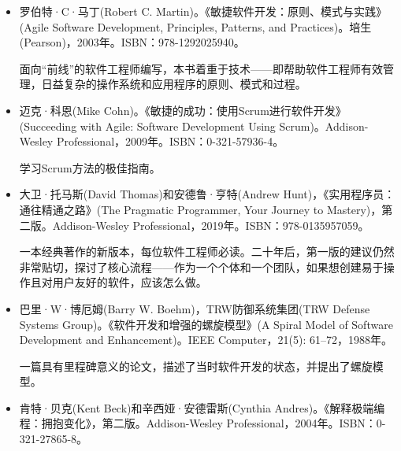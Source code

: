 \begin{itemize}
\item
罗伯特·C·马丁(Robert C. Martin)。《敏捷软件开发：原则、模式与实践》(Agile Software Development, Principles, Patterns, and Practices)。培生(Pearson)，2003年。ISBN：978-1292025940。

\hspace*{\fill}

面向“前线”的软件工程师编写，本书着重于技术——即帮助软件工程师有效管理，日益复杂的操作系统和应用程序的原则、模式和过程。

\hspace*{\fill}

\item
迈克·科恩(Mike Cohn)。《敏捷的成功：使用Scrum进行软件开发》(Succeeding with Agile: Software Development Using Scrum)。Addison-Wesley Professional，2009年。ISBN：0-321-57936-4。

\hspace*{\fill}

学习Scrum方法的极佳指南。

\hspace*{\fill}

\item
大卫·托马斯(David Thomas)和安德鲁·亨特(Andrew Hunt)，《实用程序员：通往精通之路》(The Pragmatic Programmer, Your Journey to Mastery)，第二版。Addison-Wesley Professional，2019年。ISBN：978-0135957059。

\hspace*{\fill}

一本经典著作的新版本，每位软件工程师必读。二十年后，第一版的建议仍然非常贴切，探讨了核心流程——作为一个个体和一个团队，如果想创建易于操作且对用户友好的软件，应该怎么做。

\hspace*{\fill}

\item
巴里·W·博厄姆(Barry W. Boehm)，TRW防御系统集团(TRW Defense Systems Group)。《软件开发和增强的螺旋模型》(A Spiral Model of Software Development and Enhancement)。IEEE Computer，21(5): 61–72，1988年。

\hspace*{\fill}

一篇具有里程碑意义的论文，描述了当时软件开发的状态，并提出了螺旋模型。

\hspace*{\fill}

\item
肯特·贝克(Kent Beck)和辛西娅·安德雷斯(Cynthia Andres)。《解释极端编程：拥抱变化》，第二版。Addison-Wesley Professional，2004年。ISBN：0-321-27865-8。


\end{itemize}

